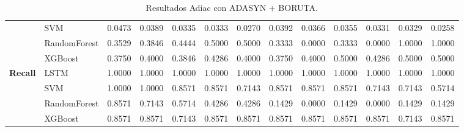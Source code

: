 \begin{table}[h]
\begin{adjustbox}{max width=15cm}
\begin{tabular}{|c|l|r|r|r|r|r|r|r|r|r|r|r|}
			& SVM &  0.0473 &  0.0389 &  0.0335 &  0.0333 &  0.0270 &  0.0392 &  0.0366 &  0.0355 &  0.0331 &  0.0329 &  0.0258 \\
			& RandomForest &  0.3529 &  0.3846 &  0.4444 &  0.5000 &  0.5000 &  0.3333 &  0.0000 &  0.3333 &  0.0000 &  1.0000 &  1.0000 \\
			& XGBoost &  0.3750 &  0.4000 &  0.3846 &  0.4286 &  0.4000 &  0.3750 &  0.4000 &  0.5000 &  0.4286 &  0.5000 &  0.5000 \\
			\hline
			\textbf{Recall} & LSTM &  1.0000 &  1.0000 &  1.0000 &  1.0000 &  1.0000 &  1.0000 &  1.0000 &  1.0000 &  1.0000 &  1.0000 &  1.0000 \\
			& SVM &  1.0000 &  1.0000 &  0.8571 &  0.8571 &  0.7143 &  0.8571 &  0.8571 &  0.8571 &  0.7143 &  0.7143 &  0.5714 \\
			& RandomForest &  0.8571 &  0.7143 &  0.5714 &  0.4286 &  0.4286 &  0.1429 &  0.0000 &  0.1429 &  0.0000 &  0.1429 &  0.1429 \\
			& XGBoost &  0.8571 &  0.8571 &  0.7143 &  0.8571 &  0.8571 &  0.8571 &  0.8571 &  0.8571 &  0.8571 &  0.7143 &  0.8571 \\
			\hline
		\end{tabular}
	\end{adjustbox}
	\caption{Resultados Adiac con ADASYN + BORUTA.}
	\label{tab:Adiac_ADASYN_BORUTA}
\end{table}
\newpage
